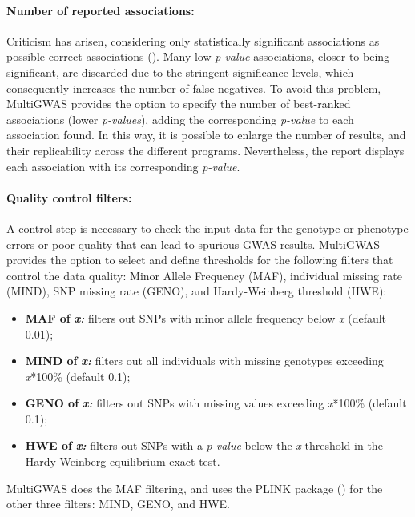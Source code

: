 \documentclass{article}
\begin{document}
\paragraph{Number of reported associations: }

Criticism has arisen, considering only statistically significant associations as possible correct associations (\cite{Thomson2011, Kaler2019}). Many low \emph{p-value} associations, closer to being significant, are discarded due to the stringent significance levels, which consequently increases the number of false negatives. To avoid this problem, MultiGWAS provides the option to specify the number of best-ranked associations (lower \emph{p-values}), adding the corresponding \emph{p-value} to each association found. In this way, it is possible to enlarge the number of results, and their replicability across the different programs. Nevertheless, the report displays each association with its corresponding \emph{p-value}.


\paragraph{Quality control filters:}

A control step is necessary to check the input data for the genotype or phenotype errors or poor quality that can lead to spurious GWAS results. MultiGWAS provides the option to select and define thresholds for the following filters that control the data quality: Minor Allele Frequency (MAF), individual missing rate (MIND), SNP missing rate (GENO), and Hardy-Weinberg threshold (HWE):
\begin{itemize}
\item \textbf{MAF of }\textbf{\emph{x:}} filters out SNPs with minor allele frequency below \emph{x} (default 0.01); 
\item \textbf{MIND of }\textbf{\emph{x:}} filters out all individuals with missing genotypes exceeding \emph{x}{*}100\% (default 0.1); 
\item \textbf{GENO of }\textbf{\emph{x:}} filters out SNPs with missing values exceeding \emph{x}{*}100\% (default 0.1); 
\item \textbf{HWE of }\textbf{\emph{x:}} filters out SNPs with a \emph{p-value} below the \emph{x} threshold in the Hardy-Weinberg equilibrium exact test.
\end{itemize}
MultiGWAS does the MAF filtering, and uses the PLINK package (\cite{Gumpinger2018}) for the other three filters: MIND, GENO, and HWE.
\end{document}
